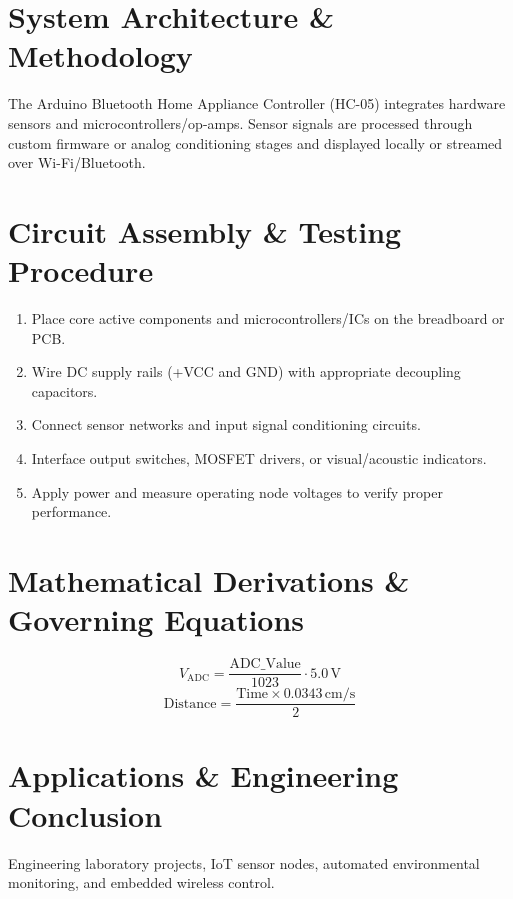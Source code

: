 \documentclass[11pt,a4paper]{article}
\begin{document}
\section{System Architecture \& Methodology}
The Arduino Bluetooth Home Appliance Controller (HC-05) integrates hardware sensors and microcontrollers/op-amps. Sensor signals are processed through custom firmware or analog conditioning stages and displayed locally or streamed over Wi-Fi/Bluetooth.

\section{Circuit Assembly \& Testing Procedure}
\begin{enumerate}
    \item Place core active components and microcontrollers/ICs on the breadboard or PCB.
    \item Wire DC supply rails (+VCC and GND) with appropriate decoupling capacitors.
    \item Connect sensor networks and input signal conditioning circuits.
    \item Interface output switches, MOSFET drivers, or visual/acoustic indicators.
    \item Apply power and measure operating node voltages to verify proper performance.
\end{enumerate}

\section{Mathematical Derivations \& Governing Equations}
\begin{equation}
V_{\text{ADC}} = \frac{\text{ADC\_Value}}{1023} \cdot 5.0\,\text{V}
\end{equation}
\begin{equation}
\text{Distance} = \frac{\text{Time} \times 0.0343\,\text{cm/s}}{2}
\end{equation}

\section{Applications \& Engineering Conclusion}
Engineering laboratory projects, IoT sensor nodes, automated environmental monitoring, and embedded wireless control.
\end{document}
